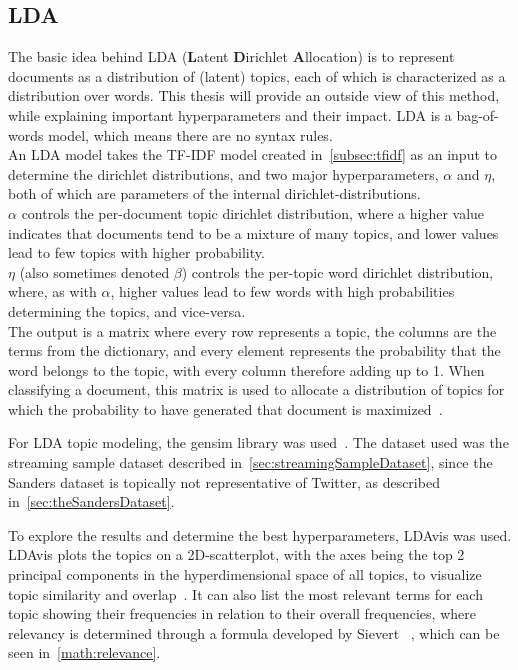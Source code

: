 \subsection{LDA}
\label{subsec:lda}

The basic idea behind LDA (\textbf{L}atent \textbf{D}irichlet \textbf{A}llocation) is to represent documents as a distribution of (latent) topics,
each of which is characterized as a distribution over words.
This thesis will provide an outside view of this method, while explaining important hyperparameters and their impact.
LDA is a bag-of-words model, which means there are no syntax rules.
\\
An LDA model takes the TF-IDF model created in~\ref{subsec:tfidf} as an input to determine the dirichlet distributions,
and two major hyperparameters, $\alpha$ and $\eta$,
both of which are parameters of the internal dirichlet-distributions.
\\
$\alpha$ controls the per-document topic dirichlet distribution,
where a higher value indicates that documents tend to be a mixture of many topics,
and lower values lead to few topics with higher probability.
\\
$\eta$ (also sometimes denoted $\beta$) controls the per-topic word dirichlet distribution, where, as with $\alpha$,
higher values lead to few words with high probabilities determining the topics,
and vice-versa.
\\
The output is a matrix where every row represents a topic,
the columns are the terms from the dictionary,
and every element represents the probability that the word belongs to the topic,
with every column therefore adding up to 1.
When classifying a document, this matrix is used to allocate a distribution of topics for which the probability to have generated that document is maximized~\cite{Blei2003}.
\par
For LDA topic modeling, the gensim library was used~\cite{gensimDocs}.
The dataset used was the streaming sample dataset described in~\ref{sec:streamingSampleDataset},
since the Sanders dataset is topically not representative of Twitter, as described in~\ref{sec:theSandersDataset}.

To explore the results and determine the best hyperparameters, LDAvis was used.
LDAvis plots the topics on a 2D-scatterplot, with the axes being the top 2 principal components
in the hyperdimensional space of all topics, to visualize topic similarity and overlap~\cite{}.
It can also list the most relevant terms for each topic showing their frequencies in relation to their overall frequencies,
where relevancy is determined through a formula developed by Sievert \etAl~\cite{sievert2014ldavis},
which can be seen in~\ref{math:relevance}.

